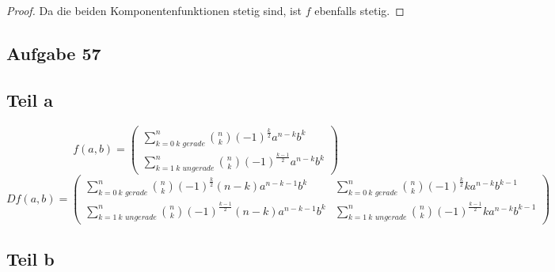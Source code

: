 \documentclass[10pt,a4paper]{article}
\begin{document}
\begin{proof}
Da die beiden Komponentenfunktionen stetig sind, ist $f$ ebenfalls stetig.

\end{proof}

\subsection*{Aufgabe 57}

\subsection*{Teil a}

\begin{equation}
f(a, b) = \begin{pmatrix}
\sum_{k = 0\ \textit{$k$ gerade}}^{n} \binom{n}{k} (-1)^{\frac{k}{2}} a^{n - k}b^{k}\\
\sum_{k = 1\ \textit{$k$ ungerade}}^{n} \binom{n}{k} (-1)^{\frac{k - 1}{2}} a^{n - k}b^{k}
\end{pmatrix}
\end{equation}
\begin{equation}
Df(a, b) = \begin{pmatrix}
\sum_{k = 0\ \textit{$k$ gerade}}^{n} \binom{n}{k} (-1)^{\frac{k}{2}} (n - k) a^{n - k - 1}b^{k} & \sum_{k = 0\ \textit{$k$ gerade}}^{n} \binom{n}{k} (-1)^{\frac{k}{2}} k a^{n - k}b^{k - 1}\\
\sum_{k = 1\ \textit{$k$ ungerade}}^{n} \binom{n}{k} (-1)^{\frac{k - 1}{2}} (n - k) a^{n - k - 1}b^{k} &
\sum_{k = 1\ \textit{$k$ ungerade}}^{n} \binom{n}{k} (-1)^{\frac{k - 1}{2}} k a^{n - k}b^{k - 1}
\end{pmatrix}
\end{equation}

\subsection*{Teil b}
\end{document}
